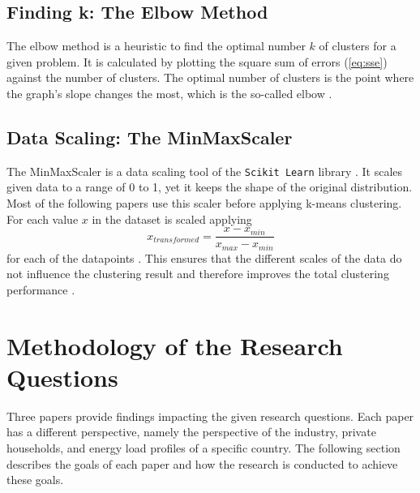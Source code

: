\subsection{Finding k: The Elbow Method}
The elbow method is a heuristic to find the optimal number $k$ of clusters for a given problem.
It is calculated by plotting the square sum of errors (\autoref{eq:sse}) against the number of clusters.
The optimal number of clusters is the point where the graph's slope changes the most, which is the so-called elbow \cite{SYA-IKC}.

\subsection{Data Scaling: The MinMaxScaler}
The MinMaxScaler is a data scaling tool of the \texttt{Scikit Learn} library \cite{SKL-MMS}.
It scales given data to a range of 0 to 1, yet it keeps the shape of the original distribution.
Most of the following papers use this scaler before applying k-means clustering.
For each value $x$ in the dataset is scaled applying \begin{equation}\label{eq:minmaxscaler} 
      x_{transformed} = \frac{x - x_{min}}{x_{max} - x_{min}}
\end{equation} for each of the datapoints \cite{JOJ-ENP}.
This ensures that the different scales of the data do not influence the clustering result and therefore improves the total clustering performance \cite{GOG-WSI}.


\section{Methodology of the Research Questions}
\label{sec:methodology_of_the_research_questions}
Three papers provide findings impacting the given research questions.
Each paper has a different perspective, namely the perspective of the industry, private households, and energy load profiles of a specific country.
The following section describes the goals of each paper and how the research is conducted to achieve these goals.

